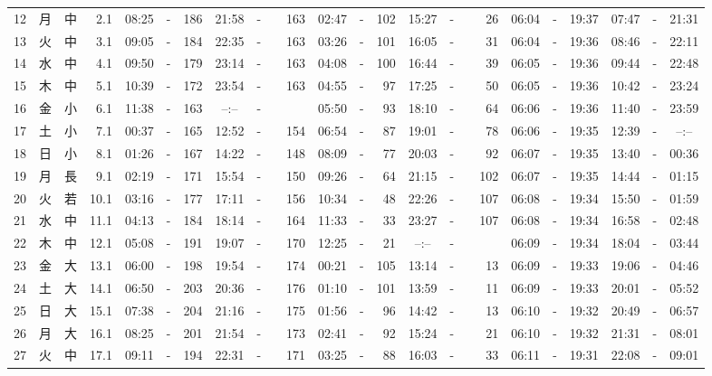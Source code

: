 \documentclass[12pt,a4j]{jsarticle}
\begin{document}
\begin{table}[htbp]
\begin{center}
{\begin{tabular}{|rc|cr|ccrccr|ccrccr|ccc|ccc|}
12 & 月 & 中 &  2.1 &  08:25 &-& 186 &  21:58 &-& 163 &  02:47 &-& 102 &  15:27 &-&  26 & 06:04 & -& 19:37 & 07:47 & -& 21:31 \\
13 & 火 & 中 &  3.1 &  09:05 &-& 184 &  22:35 &-& 163 &  03:26 &-& 101 &  16:05 &-&  31 & 06:04 & -& 19:36 & 08:46 & -& 22:11 \\
14 & 水 & 中 &  4.1 &  09:50 &-& 179 &  23:14 &-& 163 &  04:08 &-& 100 &  16:44 &-&  39 & 06:05 & -& 19:36 & 09:44 & -& 22:48 \\
15 & 木 & 中 &  5.1 &  10:39 &-& 172 &  23:54 &-& 163 &  04:55 &-&  97 &  17:25 &-&  50 & 06:05 & -& 19:36 & 10:42 & -& 23:24 \\
16 & 金 & 小 &  6.1 &  11:38 &-& 163 &  --:-- &-&~~~~~ &  05:50 &-&  93 &  18:10 &-&  64 & 06:06 & -& 19:36 & 11:40 & -& 23:59 \\
17 & 土 & 小 &  7.1 &  00:37 &-& 165 &  12:52 &-& 154 &  06:54 &-&  87 &  19:01 &-&  78 & 06:06 & -& 19:35 & 12:39 & -& --:-- \\
18 & 日 & 小 &  8.1 &  01:26 &-& 167 &  14:22 &-& 148 &  08:09 &-&  77 &  20:03 &-&  92 & 06:07 & -& 19:35 & 13:40 & -& 00:36 \\
19 & 月 & 長 &  9.1 &  02:19 &-& 171 &  15:54 &-& 150 &  09:26 &-&  64 &  21:15 &-& 102 & 06:07 & -& 19:35 & 14:44 & -& 01:15 \\
20 & 火 & 若 & 10.1 &  03:16 &-& 177 &  17:11 &-& 156 &  10:34 &-&  48 &  22:26 &-& 107 & 06:08 & -& 19:34 & 15:50 & -& 01:59 \\
21 & 水 & 中 & 11.1 &  04:13 &-& 184 &  18:14 &-& 164 &  11:33 &-&  33 &  23:27 &-& 107 & 06:08 & -& 19:34 & 16:58 & -& 02:48 \\
22 & 木 & 中 & 12.1 &  05:08 &-& 191 &  19:07 &-& 170 &  12:25 &-&  21 &  --:-- &-&~~~~~ & 06:09 & -& 19:34 & 18:04 & -& 03:44 \\
23 & 金 & 大 & 13.1 &  06:00 &-& 198 &  19:54 &-& 174 &  00:21 &-& 105 &  13:14 &-&  13 & 06:09 & -& 19:33 & 19:06 & -& 04:46 \\
24 & 土 & 大 & 14.1 &  06:50 &-& 203 &  20:36 &-& 176 &  01:10 &-& 101 &  13:59 &-&  11 & 06:09 & -& 19:33 & 20:01 & -& 05:52 \\
25 & 日 & 大 & 15.1 &  07:38 &-& 204 &  21:16 &-& 175 &  01:56 &-&  96 &  14:42 &-&  13 & 06:10 & -& 19:32 & 20:49 & -& 06:57 \\
26 & 月 & 大 & 16.1 &  08:25 &-& 201 &  21:54 &-& 173 &  02:41 &-&  92 &  15:24 &-&  21 & 06:10 & -& 19:32 & 21:31 & -& 08:01 \\
27 & 火 & 中 & 17.1 &  09:11 &-& 194 &  22:31 &-& 171 &  03:25 &-&  88 &  16:03 &-&  33 & 06:11 & -& 19:31 & 22:08 & -& 09:01 \\

\end{tabular}}
\end{center}
\end{table}
\end{document}
